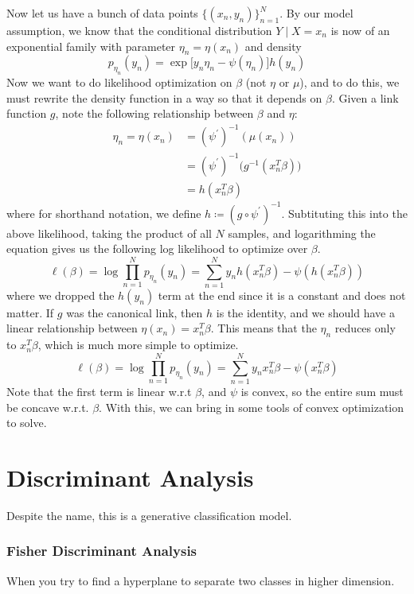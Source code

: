 \documentclass{article}
\theoremstyle{definition}
\theoremstyle{remark}
\theoremstyle{definition}
\begin{document}
Now let us have a bunch of data points $\{(x_n, y_n)\}_{n=1}^N$. By our model assumption, we know that the conditional distribution $Y \mid X = x_n$ is now of an exponential family with parameter $\eta_n = \eta (x_n)$ and density 
\[p_{\eta_n} (y_n) = \exp \big[ y_n \eta_n - \psi(\eta_n) \big] h(y_n)\]
Now we want to do likelihood optimization on $\beta$ (not $\eta$ or $\mu$), and to do this, we must rewrite the density function in a way so that it depends on $\beta$. Given a link function $g$, note the following relationship between $\beta$ and $\eta$: 
\begin{align*}
    \eta_n = \eta (x_n) & = (\psi^\prime)^{-1} (\mu (x_n)) \\
    & = (\psi^{\prime})^{-1} \big( g^{-1} (x_n^T \beta )\big) \\
    & = h(x_n^T \beta) 
\end{align*}
where for shorthand notation, we define $h \coloneqq (g \circ \psi^\prime)^{-1}$. Subtituting this into the above likelihood, taking the product of all $N$ samples, and logarithming the equation gives us the following log likelihood to optimize over $\beta$. 
\[\ell(\beta) = \log \prod_{n=1}^N p_{\eta_n} (y_n) = \sum_{n=1}^N y_n h(x_n^T \beta)  - \psi(h(x_n^T \beta) )\]
where we dropped the $h(y_n)$ term at the end since it is a constant and does not matter. If $g$ was the canonical link, then $h$ is the identity, and we should have a linear relationship between $\eta (x_n) = x_n^T \beta$. This means that the $\eta_n$ reduces only to $x_n^T \beta$, which is much more simple to optimize. 
\[\ell(\beta) = \log \prod_{n=1}^N p_{\eta_n} (y_n) = \sum_{n=1}^N y_n x_n^T \beta - \psi(x_n^T \beta)\]
Note that the first term is linear w.r.t $\beta$, and $\psi$ is convex, so the entire sum must be concave w.r.t. $\beta$. With this, we can bring in some tools of convex optimization to solve. 




\section{Discriminant Analysis}

Despite the name, this is a generative classification model. 

\subsubsection{Fisher Discriminant Analysis}

When you try to find a hyperplane to separate two classes in higher dimension. 
\end{document}
